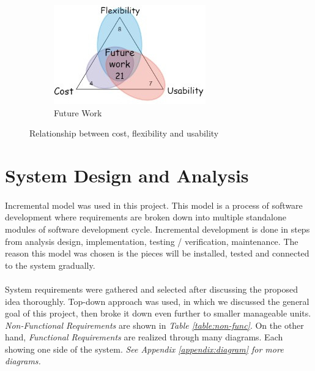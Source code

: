 \documentclass[12pt]{paper}
\begin{document}
\begin{figure}[H]
\begin{subfigure}[b]{.4\linewidth}
				\includegraphics[width=\linewidth]{img/future.jpg}
				\caption{Future Work}
			\end{subfigure}
			
			\caption{Relationship between cost, flexibility and usability}
			\label{fig:radar_diagram}
		\end{figure}
		
		\newpage\section{System Design and Analysis}
		\paragraph{} Incremental model was used in this project. This model is a process of software development where requirements are broken down into multiple standalone modules of software development cycle. Incremental development is done in steps from analysis design, implementation, testing / verification, maintenance\cite{sdlc}. The reason this model was chosen is the pieces will be installed, tested and connected to the system gradually.
		
		\paragraph{} System requirements were gathered and selected  after discussing the proposed idea thoroughly. Top-down approach was used, in which we discussed the general goal of this project, then broke it down even further to smaller manageable units. \textit{Non-Functional Requirements} are shown in \textit{Table \ref{table:non-func}}. On the other hand, \textit{Functional Requirements} are realized through many diagrams. Each showing one side of the system. \textit{See Appendix \ref{appendix:diagram} for more diagrams.}
		
\end{document}
